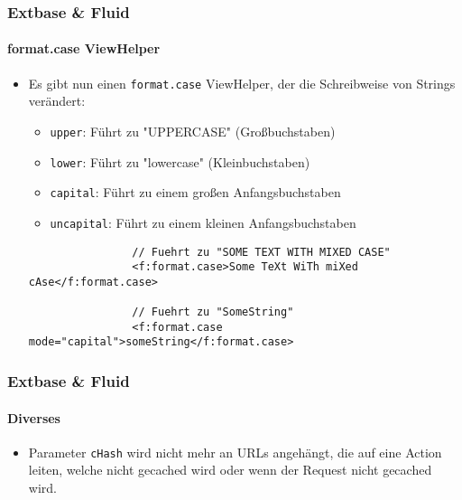 \begin{frame}[fragile]
	\frametitle{Extbase \& Fluid}
	\framesubtitle{format.case ViewHelper}

	\begin{itemize}

		\item Es gibt nun einen \texttt{format.case} ViewHelper, der die Schreibweise von Strings verändert:
			\begin{itemize}
				\item \texttt{upper}: Führt zu "UPPERCASE" (Großbuchstaben)
				\item \texttt{lower}: Führt zu "lowercase" (Kleinbuchstaben)
				\item \texttt{capital}: Führt zu einem großen Anfangsbuchstaben
				\item \texttt{uncapital}: Führt zu einem kleinen Anfangsbuchstaben
			\end{itemize}

			\begin{lstlisting}
				// Fuehrt zu "SOME TEXT WITH MIXED CASE"
				<f:format.case>Some TeXt WiTh miXed cAse</f:format.case>

				// Fuehrt zu "SomeString"
				<f:format.case mode="capital">someString</f:format.case>
			\end{lstlisting}

	\end{itemize}

\end{frame}


\begin{frame}[fragile]
	\frametitle{Extbase \& Fluid}
	\framesubtitle{Diverses}

	\begin{itemize}

		\item Parameter \texttt{cHash} wird nicht mehr an URLs angehängt, die auf eine
			Action leiten, welche nicht gecached wird oder wenn der Request nicht gecached
			wird.

	\end{itemize}

\end{frame}
